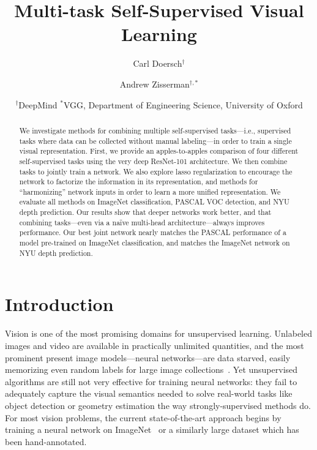 \documentclass[10pt,twocolumn,letterpaper]{article}
\begin{document}
\title{Multi-task Self-Supervised Visual Learning}

\author{Carl  Doersch$^\dagger$
\and
Andrew Zisserman$^{\dagger,*}$
\and
$^\dagger$DeepMind
\quad\quad\quad
$^*$VGG, Department of Engineering Science, University of Oxford\\
}


\maketitle


\begin{abstract}
We investigate methods for combining multiple self-supervised
tasks---i.e., supervised tasks where data can be collected without
manual labeling---in order to train a single visual representation.
First, we provide an apples-to-apples comparison of four different
self-supervised tasks using the very deep ResNet-101 architecture.  
We then combine tasks to jointly train a network. We also explore lasso regularization to encourage the
network to factorize the information in its representation, and methods for ``harmonizing'' network inputs in order
to learn a more unified representation.  
We evaluate all methods on ImageNet classification, PASCAL VOC detection, and NYU depth prediction.
Our results show that deeper networks work better, and that combining tasks---even via a na{\"i}ve multi-head architecture---always improves performance.
Our best joint network nearly matches 
the PASCAL performance of a model pre-trained on ImageNet classification, and matches the ImageNet network on NYU depth prediction.
\end{abstract}


\section{Introduction}


Vision is one of the most promising domains for unsupervised learning.
Unlabeled images and video are available in practically unlimited quantities, and the most prominent present image models---neural networks---are data starved, easily memorizing even random labels for large image collections~\cite{zhang2016understanding}.
Yet unsupervised algorithms are still not very effective for training neural networks:
they fail to adequately capture the visual semantics needed to solve real-world tasks like object detection or geometry estimation the way strongly-supervised methods do.  
For most vision problems, the current state-of-the-art approach begins by training a neural network on ImageNet~\cite{russakovsky2015imagenet} or a similarly large dataset which has been hand-annotated.
\end{document}
